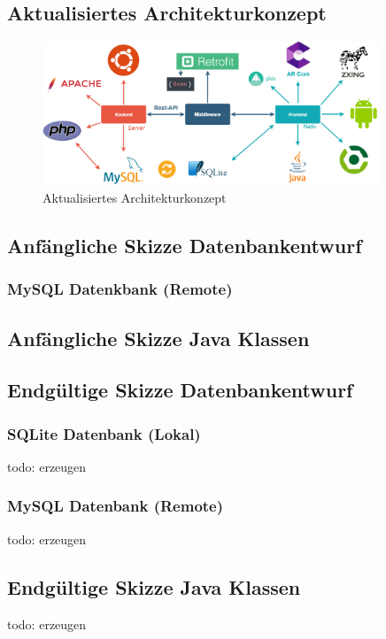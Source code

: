 \documentclass{scrartcl}
\begin{document}
\subsection{Aktualisiertes Architekturkonzept}

\begin{figure}[h]
\centering
\includegraphics[width=380px]{img/ArchitekturkonzeptNew.png}
\caption{Aktualisiertes Architekturkonzept}
\end{figure}

\subsection{Anfängliche Skizze Datenbankentwurf}

\subsubsection{MySQL Datenkbank (Remote)}

\subsection{Anfängliche Skizze Java Klassen}

\subsection{Endgültige Skizze Datenbankentwurf}

\subsubsection{SQLite Datenbank (Lokal)}
todo: erzeugen

\subsubsection{MySQL Datenbank (Remote)}
todo: erzeugen

\subsection{Endgültige Skizze Java Klassen}
todo: erzeugen
\end{document}
